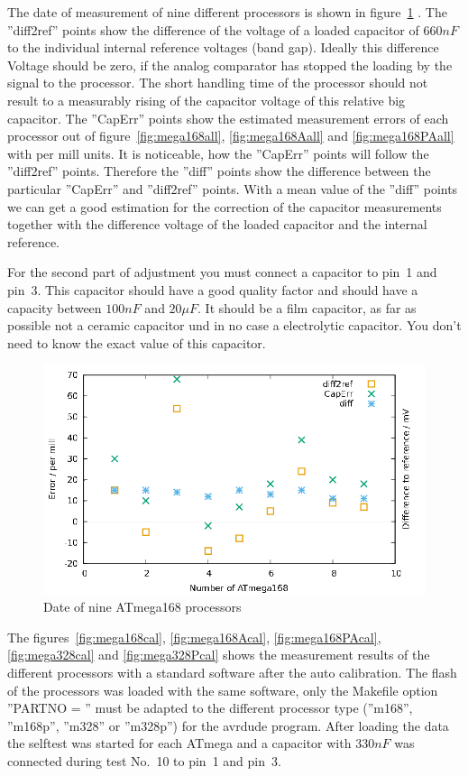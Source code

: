 The date of measurement of nine different processors is shown in figure~\ref{fig:CompAdjust} .
The ''diff2ref'' points show the difference of the voltage of a loaded capacitor of \(660nF\) to the
individual internal reference voltages (band gap).
Ideally this difference Voltage should be zero, if the analog comparator has stopped the loading by the signal to
the processor. The short handling time of the processor should not result to a measurably rising of the 
capacitor voltage of this relative big capacitor.
The ''CapErr'' points show the estimated measurement errors of each processor out of figure~\ref{fig:mega168all}, \ref{fig:mega168Aall} 
and \ref{fig:mega168PAall} with per mill units.
It is noticeable, how the ''CapErr'' points will follow the ''diff2ref'' points.
Therefore the ''diff'' points show the difference between the particular ''CapErr'' and ''diff2ref'' points.
With a mean value of the ''diff'' points we can get a good estimation for the correction of the capacitor
measurements together with the difference voltage of the loaded capacitor and the internal reference.

For the second part of adjustment you must connect a capacitor to pin~1 and pin~3. This capacitor should have
a good quality factor and should have a capacity between \(100nF\) and \(20\mu F\).
It should be a film capacitor, as far as possible not a ceramic capacitor und in no case a electrolytic capacitor.
You don't need to know the exact value of this capacitor.

\begin{figure}[H]
\centering
\includegraphics[]{../GNU/ComparatorAdjust.pdf}
\caption{Date of nine ATmega168 processors}
\label{fig:CompAdjust}
\end{figure}

The figures~\ref{fig:mega168cal}, \ref{fig:mega168Acal}, \ref{fig:mega168PAcal}, \ref{fig:mega328cal} and \ref{fig:mega328Pcal}
 shows the measurement results
of the different processors with a standard software after the auto calibration.
The flash of the processors was loaded with the same software, only the Makefile  option ''PARTNO = '' must be
adapted to the different processor type (''m168'', ''m168p'', ''m328'' or ''m328p'') for the avrdude program.
After loading the data the selftest was started for each ATmega and a capacitor with \(330nF\) was connected
during test No.~10 to pin~1 and pin~3.

